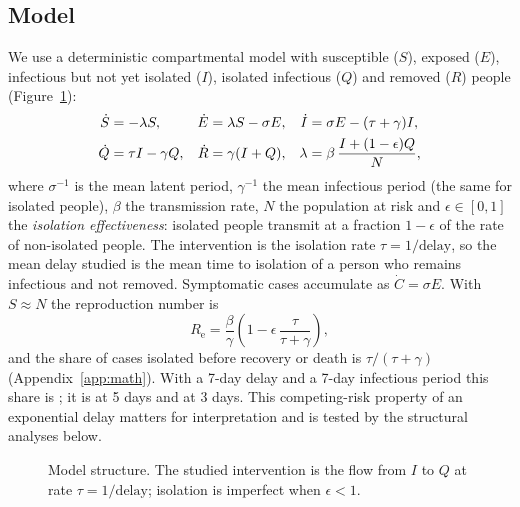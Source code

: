 \documentclass[11pt,a4paper]{article}
\newcommand{\Rt}{R_{\mathrm{e}}}
\begin{document}
\subsection{Model}
We use a deterministic compartmental model with susceptible ($S$), exposed ($E$), infectious but not yet isolated ($I$), isolated infectious ($Q$) and removed ($R$) people (Figure~\ref{fig:model}):
\begin{align}
\dot S &= -\lambda S, & \dot E &= \lambda S-\sigma E, & \dot I &= \sigma E-(\tau+\gamma)I, \notag\\
\dot Q &= \tau I-\gamma Q, & \dot R &= \gamma(I+Q), & \lambda &= \beta\,\frac{I+(1-\epsilon)Q}{N}, \label{eq:model}
\end{align}
where $\sigma^{-1}$ is the mean latent period, $\gamma^{-1}$ the mean infectious period (the same for isolated people), $\beta$ the transmission rate, $N$ the population at risk and $\epsilon\in[0,1]$ the \emph{isolation effectiveness}: isolated people transmit at a fraction $1-\epsilon$ of the rate of non-isolated people. The intervention is the isolation rate $\tau=1/\text{delay}$, so the mean delay studied is the mean time to isolation of a person who remains infectious and not removed. Symptomatic cases accumulate as $\dot C=\sigma E$. With $S\approx N$ the reproduction number is
\begin{equation}
\Rt=\frac{\beta}{\gamma}\left(1-\epsilon\,\frac{\tau}{\tau+\gamma}\right), \label{eq:Re}
\end{equation}
and the share of cases isolated before recovery or death is $\tau/(\tau+\gamma)$ (Appendix~\ref{app:math}). With a 7-day delay and a 7-day infectious period this share is \aIsoSeven; it is \aIsoFive{} at 5 days and \aIsoThree{} at 3 days. This competing-risk property of an exponential delay matters for interpretation and is tested by the structural analyses below.

\begin{figure}[H]\centering
{}
\caption{Model structure. The studied intervention is the flow from $I$ to $Q$ at rate $\tau=1/\text{delay}$; isolation is imperfect when $\epsilon<1$.}\label{fig:model}
\end{figure}
\end{document}
